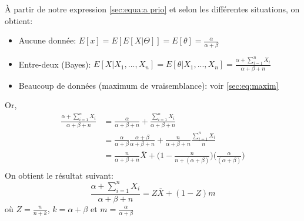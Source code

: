 À partir de notre expression \ref{sec:equa:a prio} et selon les différentes situations, on obtient:
\begin{itemize}
\item Aucune donnée: $ E[x] = E[E[X|\Theta]] = E[\theta] = \frac{\alpha}{\alpha + \beta}$
\item Entre-deux (Bayes): $E[X|X_1, ..., X_n] = E[\theta|X_1, ..., X_n] = \frac{\alpha + \sum_{i =1}^{n} X_i}{\alpha + \beta + n}$
\item Beaucoup de données (maximum de vraisemblance): voir \ref{sec:eq:maxim}
\end{itemize}
Or,
\begin{align*}
\frac{\alpha + \sum_{i =1}^{n} X_i}{\alpha + \beta + n} &= \frac{\alpha}{\alpha + \beta + n} + \frac{\sum_{i =1}^{n} X_i}{\alpha + \beta + n}\\
&=\frac{\alpha}{\alpha + \beta}\frac{\alpha + \beta}{\alpha + \beta + n} + \frac{n}{\alpha + \beta + n}\frac{\sum_{i =1}^{n} X_i}{n}\\
&=\frac{n}{\alpha + \beta + n} \overline{X} + \Bigg(1 - \frac{n}{n + (\alpha + \beta)}\Bigg)\Bigg(\frac{\alpha}{(\alpha + \beta)}\Bigg)\\
\end{align*}
On obtient le résultat suivant:
\begin{equation}
\frac{\alpha + \sum_{i =1}^{n} X_i}{\alpha + \beta + n} = Z \overline{X} + (1 - Z) m
\end{equation}
où $Z = \frac{n}{n + k}$, $k = \alpha + \beta$ et $m= \frac{\alpha}{\alpha + \beta}$

